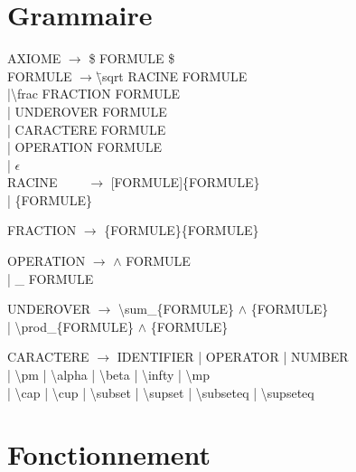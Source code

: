 \documentclass[12pt,a4paper]{article}
\begin{document}
\section{Grammaire}
\begin{tabbing}
AXIOME $\rightarrow$ \$ FORMULE \$\\

FORMULE 	$\rightarrow$\= \textbackslash sqrt RACINE FORMULE\\
	\>|\textbackslash frac FRACTION FORMULE\\
	\>| UNDEROVER FORMULE\\
	\>| CARACTERE FORMULE\\
	\>| OPERATION FORMULE\\
	\>| $\epsilon$ \\

RACINE	~~~~$\rightarrow$ [FORMULE]\{FORMULE\} \\
		\>| \{FORMULE\}\\

\linebreak

FRACTION	$\rightarrow$ \{FORMULE\}\{FORMULE\}\\

\linebreak

OPERATION	$\rightarrow$ $\wedge$ FORMULE\\
		\>| \_ FORMULE\\

\linebreak

UNDEROVER	$\rightarrow$ \textbackslash sum\_\{FORMULE\} $\wedge$ \{FORMULE\} \\
		\>| \textbackslash prod\_\{FORMULE\} $\wedge$ \{FORMULE\} \\

\linebreak

CARACTERE	$\rightarrow$ IDENTIFIER | OPERATOR | NUMBER\\
 \>| \textbackslash pm | \textbackslash alpha | \textbackslash beta | \textbackslash infty |  \textbackslash mp \\
 \>| \textbackslash cap | \textbackslash cup  | \textbackslash subset  | \textbackslash supset  | \textbackslash subseteq | \textbackslash supseteq

\end{tabbing}


\section{Fonctionnement }
\end{document}
